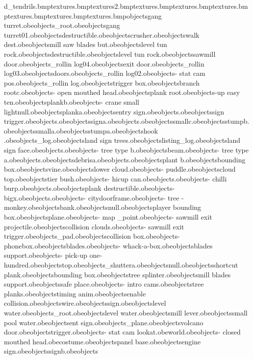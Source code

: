 d_tendrils.bmp textures\gramarm.bmp textures\gramarmcor2.bmp textures\gramarmcor.bmp textures\gramtop.bmp textures\grambox.bmp textures\gramnut.bmp textures\record.bmp textures\gramhorn.bmp objects\anvil gang turret.obe objects_root.obe objects\anvil gang turret01.obe objects\walkway destructible.obe objects\sawmill crusher.obe objects\volcano walk dest.obe objects\null mill saw blades but.obe objects\upper level tun rock.obe objects\suitcase destructible.obe objects\lower level tun rock.obe objects\right sawmill door.obe objects\bank_rollin log04.obe objects\sawmill exit door.obe objects\bank_rollin log03.obe objects\lift doors.obe objects\bank_rollin log02.obe objects\bank - stat cam pos.obe objects\bank_rollin log.obe objects\exit trigger box.obe objects\springy branch rootc.obe objects\bank - open mouthed head.obe objects\springy plank root.obe objects\pick-up easy ten.obe objects\tilting plankb.obe objects\bank - crane small lightnull.obe objects\tilting planka.obe objects\no entry sign.obe objects\plankc.obe objects\wobble sign trigger.obe objects\plankb.obe objects\wobble signa.obe objects\planka.obe objects\digger smallc.obe objects\sinking stumpb.obe objects\digger smalla.obe objects\sinking stumpa.obe objects\crane hook .obe objects\listing_log.obe objects\taz land sign trees.obe objects\hanging listing_log.obe objects\taz land sign face.obe objects\leaves.obe objects\bank - tree type b.obe objects\light beam.obe objects\bank - tree type a.obe objects\start.obe objects\spiky debrisa.obe objects\butterfly.obe objects\tasmania plant b.obe objects\butterfly bounding box.obe objects\spicky vine.obe objects\volcano lower cloud.obe objects\bank - puddle.obe objects\volcano cloud top.obe objects\two tier bush.obe objects\bank - hicup can.obe objects\waterfall.obe objects\bank - chilli burp.obe objects\cameras.obe objects\tree plank destructible.obe objects\bank - bigx.obe objects\monkey.obe objects\bank - citydoorframe.obe objects\bank - tree - monkey.obe objects\sprite bank.obe objects\main null.obe objects\music player bounding box.obe objects\death plane.obe objects\bank - map _point.obe objects\bank - sawmill exit projectile.obe objects\no collision clouds.obe objects\bank- sawmill exit trigger.obe objects\lilly_pad.obe objects\blades collision box.obe objects\bank - phonebox.obe objects\crusher blades.obe objects\bank - whack-a-box.obe objects\crusher blades support.obe objects\bank - pick-up one-hundred.obe objects\conveyors top.obe objects\bank_shuttera.obe objects\fish null.obe objects\tree shortcut plank.obe objects\fish bounding box.obe objects\orange tree splinter.obe objects\saw mill blades support.obe objects\taz safe place.obe objects\bank - intro cams.obe objects\destructible tree planks.obe objects\sawmill timing anim.obe objects\sawmill enable collision.obe objects\claw wire.obe objects\sam sign.obe objects\ground level water.obe objects_root.obe objects\lower level water.obe objects\saw mill lever.obe objects\top small pool water.obe objects\tunnel ent sign.obe objects\water_plane.obe objects\right volcano door.obe objects\zepplin trigger.obe objects\bank - stat cam lookat.obe world.obe objects\bank - closed mouthed head.obe costume\taztarzan.obe objects\control panel base.obe objects\jet engine sign.obe objects\wobble signb.obe objects\jet 